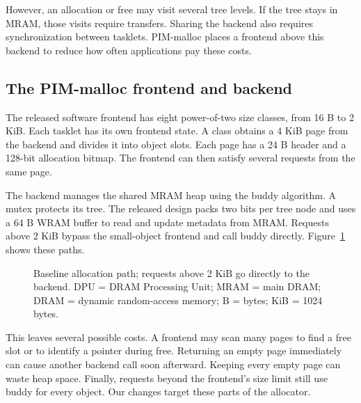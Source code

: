 \documentclass[conference]{IEEEtran}
\begin{document}
However, an allocation or free may visit several tree levels. If the tree stays in MRAM, those visits require transfers. Sharing the backend also requires synchronization between tasklets. PIM-malloc places a frontend above this backend to reduce how often applications pay these costs.

\subsection{The PIM-malloc frontend and backend}
The released software frontend has eight power-of-two size classes, from 16 B to 2 KiB. Each tasklet has its own frontend state. A class obtains a 4 KiB page from the backend and divides it into object slots. Each page has a 24 B header and a 128-bit allocation bitmap. The frontend can then satisfy several requests from the same page.

The backend manages the shared MRAM heap using the buddy algorithm. A mutex protects its tree. The released design packs two bits per tree node and uses a 64 B WRAM buffer to read and update metadata from MRAM. Requests above 2 KiB bypass the small-object frontend and call buddy directly. Figure~\ref{fig:baseline-path} shows these paths.

\begin{figure}[t]
\centering
{}
\caption{Baseline allocation path; requests above 2 KiB go directly to the backend. DPU = DRAM Processing Unit; MRAM = main DRAM; DRAM = dynamic random-access memory; B = bytes; KiB = 1024 bytes.}
\label{fig:baseline-path}
\end{figure}

This leaves several possible costs. A frontend may scan many pages to find a free slot or to identify a pointer during free. Returning an empty page immediately can cause another backend call soon afterward. Keeping every empty page can waste heap space. Finally, requests beyond the frontend's size limit still use buddy for every object. Our changes target these parts of the allocator.
\end{document}
